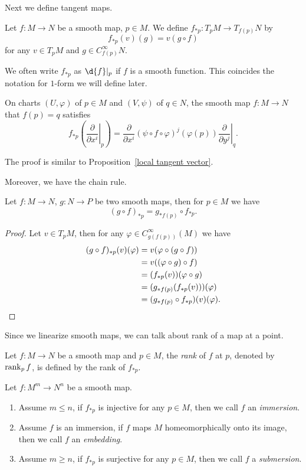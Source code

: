 Next we define tangent maps.
\begin{defn}
    Let $f:M\to N$ be a smooth map, $p\in M$.
    We define $f_{*p}:T_pM\to T_{f(p)}N$ by
    \[f_{*p}(v)(g)=v(g\circ f)\]
    for any $v\in T_pM$ and $g\in C^\infty_{f(p)}N$.
\end{defn}

\begin{rem}
    We often write $f_{*p}$ as $\d{f}|_p$ if $f$ is a smooth function.
    This coincides the notation for $1$-form we will define later.
\end{rem}

\begin{lem}
    On charts $(U,\varphi)$ of $p\in M$ and $(V,\psi)$ of $q\in N$, the smooth map $f:M\to N$ that $f(p)=q$ satisfies
    \[f_{*p}\left(\left.\frac{\partial{}}{\partial{x^i}}\right|_p\right)=\frac{\partial{}}{\partial{x^i}}(\psi\circ f\circ\varphi)^j(\varphi(p))\left.\frac{\partial{}}{\partial{y^j}}\right|_q.\]
\end{lem}
The proof is similar to Proposition~\ref{local tangent vector}.

Moreover, we have the chain rule.
\begin{prop}
    Let $f:M\to N$, $g:N\to P$ be two smooth maps, then for $p\in M$ we have
    \[(g\circ f)_{*p}=g_{*f(p)}\circ f_{*p}.\]
\end{prop}
\begin{proof}
    Let $v\in T_pM$, then for any $\varphi\in C^\infty_{g(f(p))}(M)$ we have
    \begin{align*}
        (g\circ f)_{*p}(v)(\varphi)&=v(\varphi\circ(g\circ f))\\
        &=v((\varphi\circ g)\circ f)\\
        &=(f_{*p}(v))(\varphi\circ g)\\
        &=(g_{*f(p)}(f_{*p}(v)))(\varphi)\\
        &=(g_{*f(p)}\circ f_{*p})(v)(\varphi).\qedhere
    \end{align*} 
\end{proof}

Since we linearize smooth maps, we can talk about rank of a map at a point.
\begin{defn}
    Let $f:M\to N$ be a smooth map and $p\in M$, the \emph{rank} of $f$ at $p$, denoted by $\operatorname{rank}_p{f}$, is defined by the rank of $f_{*p}$.
\end{defn}

\begin{defn}
    Let $f:M^m\to N^n$ be a smooth map.
    \begin{enumerate}[(1)]
        \item Assume $m\leq n$, if $f_{*p}$ is injective for any $p\in M$, then we call $f$ an \emph{immersion}.
        \item Assume $f$ is an immersion, if $f$ maps $M$ homeomorphically onto its image, then we call $f$ an \emph{embedding}.
        \item Assume $m\geq n$, if $f_{*p}$ is surjective for any $p\in M$, then we call $f$ a \emph{submersion}.
    \end{enumerate}
\end{defn}

